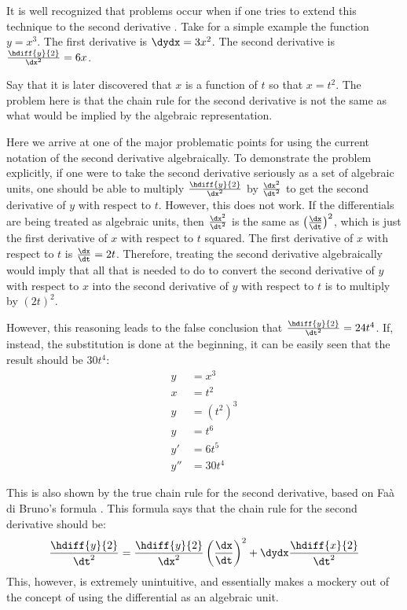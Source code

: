 It is well recognized that problems occur when if one tries to extend this technique to the second derivative \citep{swokowski1983}.
Take for a simple example the function $y = x^3$.
The first derivative is $\dydx = 3x^2$.
The second derivative is $\frac{\hdiff{y}{2}}{\dx^2} = 6x$.

Say that it is later discovered that $x$ is a function of $t$ so that $x = t^2$.
The problem here is that the chain rule for the second derivative is not the same as what would be implied by the algebraic representation.

Here we arrive at one of the major problematic points for using the current notation of the second derivative algebraically.
To demonstrate the problem explicitly, if one were to take the second derivative seriously as a set of algebraic units, one should be able to multiply $\frac{\hdiff{y}{2}}{\dx^2}$ by $\frac{\dx^2}{\dt^2}$ to get the second derivative of $y$ with respect to $t$.
However, this does not work.
If the differentials are being treated as algebraic units, then $\frac{\dx^2}{\dt^2}$ is the same as $\left(\frac{\dx}{\dt}\right)^2$, which is just the first derivative of $x$ with respect to $t$ squared.
The first derivative of $x$ with respect to $t$ is $\frac{\dx}{\dt} = 2t$.
Therefore, treating the second derivative algebraically would imply that all that is needed to do to convert the second derivative of $y$ with respect to $x$ into the second derivative of $y$ with respect to $t$ is to multiply by $(2t)^2$.

However, this reasoning leads to the false conclusion that $\frac{\hdiff{y}{2}}{\dt^2} = 24t^4$.
If, instead, the substitution is done at the beginning, it can be easily seen that the result should be $30t^4$:
\begin{align*}
y &= x^3 \\
x &= t^2 \\
y &= (t^2)^3 \\
y &= t^6 \\
y' &= 6t^5 \\
y'' &= 30t^4 
\end{align*}

This is also shown by the true chain rule for the second derivative, based on Fa\`a di Bruno's formula \citep{johnson2002}.
This formula says that the chain rule for the second derivative should be:
\begin{equation}
\label{chainrulesecond}
\frac{\hdiff{y}{2}}{\dt^2} = \frac{\hdiff{y}{2}}{\dx^2}\left(\frac{\dx}{\dt}\right)^2 + \dydx \frac{\hdiff{x}{2}}{\dt^2} 
\end{equation}
This, however, is extremely unintuitive, and essentially makes a mockery out of the concept of using the differential as an algebraic unit.

